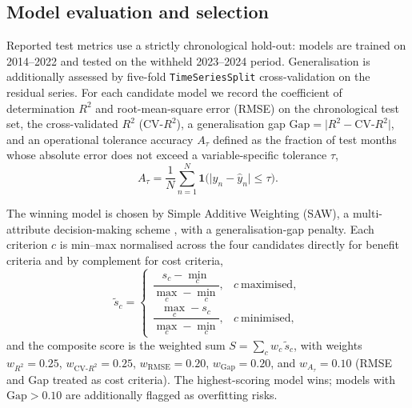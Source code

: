 \documentclass[review,11pt]{elsarticle}
\begin{document}
\subsection{Model evaluation and selection}\label{sec:saw}
Reported test metrics use a strictly chronological hold-out: models are trained
on 2014--2022 and tested on the withheld 2023--2024 period. Generalisation is
additionally assessed by five-fold \texttt{TimeSeriesSplit} cross-validation on
the residual series. For each candidate model we record the coefficient of
determination $R^{2}$ and root-mean-square error (RMSE) on the chronological
test set, the cross-validated $R^{2}$ ($\mathrm{CV}\text{-}R^{2}$), a
generalisation gap $\mathrm{Gap}=\lvert R^{2}-\mathrm{CV}\text{-}R^{2}\rvert$,
and an operational tolerance accuracy $A_{\tau}$ defined as the fraction of test
months whose absolute error does not exceed a variable-specific tolerance
$\tau$,
\begin{equation}
A_{\tau}=\frac{1}{N}\sum_{n=1}^{N}\mathbf{1}\!\big(\lvert y_{n}-\hat{y}_{n}\rvert
\le \tau\big).
\end{equation}

The winning model is chosen by Simple Additive Weighting (SAW), a multi-attribute
decision-making scheme \citep{Hwang1981}, with a generalisation-gap penalty. Each criterion $c$ is min--max normalised across the
four candidates directly for benefit criteria and by complement for cost
criteria,
\begin{equation}
\tilde{s}_{c}=
\begin{cases}
\dfrac{s_{c}-\min_{c}}{\max_{c}-\min_{c}}, & c\ \text{maximised},\\[1.2ex]
\dfrac{\max_{c}-s_{c}}{\max_{c}-\min_{c}}, & c\ \text{minimised},
\end{cases}
\end{equation}
and the composite score is the weighted sum
$S=\sum_{c} w_{c}\,\tilde{s}_{c}$, with weights $w_{R^{2}}=0.25$,
$w_{\mathrm{CV}\text{-}R^{2}}=0.25$, $w_{\mathrm{RMSE}}=0.20$,
$w_{\mathrm{Gap}}=0.20$, and $w_{A_{\tau}}=0.10$ (RMSE and Gap treated as cost
criteria). The highest-scoring model wins; models with $\mathrm{Gap}>0.10$ are
additionally flagged as overfitting risks.
\end{document}
